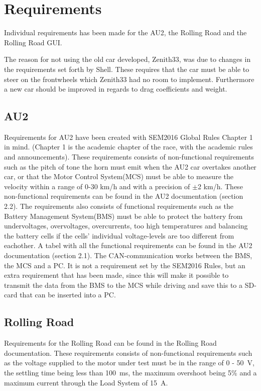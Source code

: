 \chapter{Requirements}
Individual requirements has been made for the AU2, the Rolling Road and the Rolling Road GUI.

The reason for not using the old car developed, Zenith33, was due to changes in the requirements set forth by Shell. These requires that the car must be able to steer on the frontwheels which Zenith33 had no room to implement. Furthermore a new car should be improved in regards to drag coefficients and weight.

\section{AU2}
Requirements for AU2 have been created with SEM2016 Global Rules Chapter 1 in mind\cite{ShellRequirements}. (Chapter 1 is the academic chapter of the race, with the academic rules and announcements). These requirements consists of non-functional requirements such as the pitch of tone the horn must emit when the AU2 car overtakes another car, or that the Motor Control System(MCS) must be able to measure the velocity within a range of 0-30 km/h and with a precision of $\pm$2 km/h. These non-functional requirements can be found in the AU2 documentation\cite{AU2} (section 2.2). The requirements also consists of functional requirements such as the Battery Management System(BMS) must be able to protect the battery from undervoltages, overvoltages, overcurrents, too high temperatures and balancing the battery cells if the cells' individual voltage-levels are too different from eachother. A tabel with all the functional requirements can be found in the AU2 documentation\cite{AU2} (section 2.1). The CAN-communication works between the BMS, the MCS and a PC. It is not a requirement set by the SEM2016 Rules, but an extra requirement that has been made, since this will make it possible to transmit the data from the BMS to the MCS while driving and save this to a SD-card that can be inserted into a PC.

\section{Rolling Road}
Requirements for the Rolling Road can be found in the Rolling Road documentation\cite{RR}.
These requirements consists of non-functional requirements such as the voltage supplied to the motor under test must be in the range of 0 - \SI{50}{\volt}, the settling time being less than \SI{100}{\milli \second}, the maximum overshoot being 5\% and a maximum current through the Load System of \SI{15}{\ampere}.

